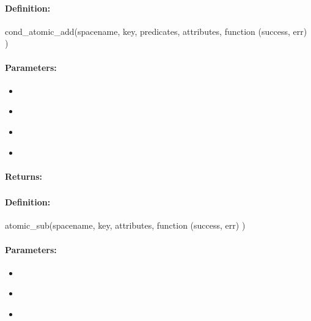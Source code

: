 \paragraph{Definition:}
\begin{javascriptcode}
cond_atomic_add(spacename, key, predicates, attributes, function (success, err) {})
\end{javascriptcode}
\paragraph{Parameters:}
\begin{itemize}[noitemsep]
\item {}\\

\item {}\\

\item {}\\

\item {}\\

\end{itemize}

\paragraph{Returns:}


\pagebreak
\subsubsection{}
\label{api:nodejs:atomic_sub}


\paragraph{Definition:}
\begin{javascriptcode}
atomic_sub(spacename, key, attributes, function (success, err) {})
\end{javascriptcode}
\paragraph{Parameters:}
\begin{itemize}[noitemsep]
\item {}\\

\item {}\\

\item {}\\

\end{itemize}

